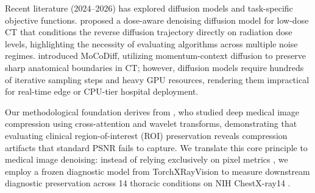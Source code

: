 \documentclass[11pt]{article}
\begin{document}
Recent literature (2024--2026) has explored diffusion models and task-specific objective functions. \citet{kim2025doseaware} proposed a dose-aware denoising diffusion model for low-dose CT that conditions the reverse diffusion trajectory directly on radiation dose levels, highlighting the necessity of evaluating algorithms across multiple noise regimes. \citet{zhao2025mocodiff} introduced MoCoDiff, utilizing momentum-context diffusion to preserve sharp anatomical boundaries in CT; however, diffusion models require hundreds of iterative sampling steps and heavy GPU resources, rendering them impractical for real-time edge or CPU-tier hospital deployment. 

Our methodological foundation derives from \citet{dai2025compression}, who studied deep medical image compression using cross-attention and wavelet transforms, demonstrating that evaluating clinical region-of-interest (ROI) preservation reveals compression artifacts that standard PSNR fails to capture. We translate this core principle to medical image denoising: instead of relying exclusively on pixel metrics \citep{wang2004ssim}, we employ a frozen diagnostic model from TorchXRayVision \citep{cohen2022torchxrayvision} to measure downstream diagnostic preservation across 14 thoracic conditions on NIH ChestX-ray14 \citep{wang2017chestxray8}.
\end{document}
